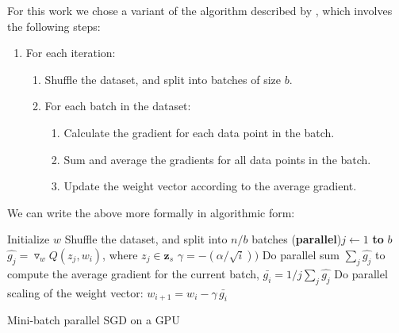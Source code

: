 \documentclass[11pt,a4paper]{article}
\begin{document}
For this work we chose a variant of the algorithm described by \cite{dekel2012optimal}, which involves the following steps:

\begin{enumerate}
	\item  	For each iteration:
	\begin{enumerate}
		\item Shuffle the dataset, and split into batches of size $b$.
		\item For each batch in the dataset:
		\begin{enumerate}
			\item Calculate the gradient for each data point in the batch.
			\item Sum and average the gradients for all data points in the batch.
			\item Update the weight vector according to the average gradient.
		\end{enumerate}
	\end{enumerate}
\end{enumerate}

We can write the above more formally in algorithmic form:

\begin{algorithm}
	\DontPrintSemicolon %
	Initialize $w$\;
	 {
		Shuffle the dataset, and split into $n/b$ batches\;
		 {
			\For(\textbf{parallel}){$j \gets 1$ \textbf{to} $b$} {
				$\hat{g_j} = \triangledown_w Q(z_j, w_i)$, where $z_j \in \mathbf{z}_s$\;
			}
			$\gamma = -(\alpha / \sqrt{i}))$\;
			Do parallel sum $\sum_j{\hat{g_j}}$ to compute the average gradient for the current batch, $\bar{g_i} = 1/j \sum_j{\hat{g_j}}$\;
			Do parallel scaling of the weight vector: $w_{i + 1} = w_i - \gamma \,  \bar{g_i}$\;
		}
	}
	\;
	\caption{Mini-batch parallel SGD on a GPU}
	\label{algo:sgd-gpu}
\end{algorithm}
\end{document}
